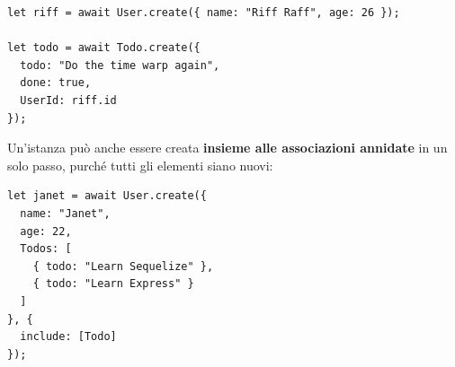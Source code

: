 \begin{affianco}[0.54][c]
\begin{lstlisting}[style=js, name=linked.js]
let riff = await User.create({ name: "Riff Raff", age: 26 });

let todo = await Todo.create({
  todo: "Do the time warp again",
  done: true,
  UserId: riff.id
});
\end{lstlisting}
\risultato
\begin{immagine}
\end{immagine}
\end{affianco}

Un'istanza può anche essere creata \textbf{insieme alle associazioni annidate}
in un solo passo, purché tutti gli elementi siano nuovi:

\begin{affianco}[0.45][c]
\begin{lstlisting}[style=js, name=nested.js]
let janet = await User.create({
  name: "Janet",
  age: 22,
  Todos: [
    { todo: "Learn Sequelize" },
    { todo: "Learn Express" }
  ]
}, {
  include: [Todo]
});
\end{lstlisting}
\risultato
\begin{immagine}
\end{immagine}
\end{affianco}

